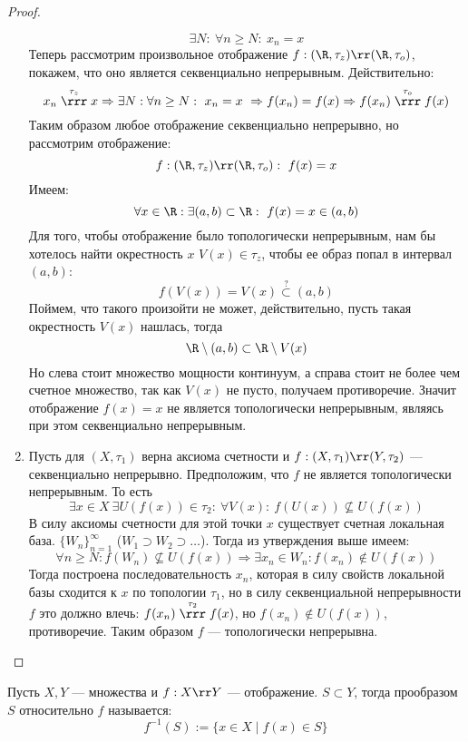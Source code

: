 \begin{proof}
\begin{enumerate}
$$	\exists N : \ \forall n \geq N :\ x_n = x
	$$
	Теперь рассмотрим произвольное отображение $f: (\R, \tau_z) \rr (\R, \tau_o)$, покажем, что оно является секвенциально непрерывным. Действительно:
	$$
	x_n \stackrel{\tau_z}{\rrr} x \Rightarrow \exists N: \forall n \geq N: \ x_n = x \ \Rightarrow f(x_n) = f(x) \Rightarrow f(x_n) \stackrel{\tau_o}{\rrr} f(x)
	$$
	Таким образом любое отображение секвенциально непрерывно, но рассмотрим отображение:
	$$
	f: (\R, \tau_z) \rr (\R, \tau_o) :\ f(x) = x
	$$
	Имеем:
	$$
	\forall x \in \R: \exists (a,b) \subset \R :\ f(x) = x \in (a,b)
	$$
	Для того, чтобы отображение было топологически непрерывным, нам бы хотелось найти окрестность $x$ $V(x) \in \tau_z$, чтобы ее образ  попал в интервал $(a,b)$: 
	$$
	f(V(x)) = V(x) \stackrel{?}{\subset} (a,b)
	$$ 
	Поймем, что такого произойти не может, действительно, пусть такая окрестность $V(x)$ нашлась, тогда
	$$
	\R \setminus (a,b) \subset \R \setminus V(x) 
	$$
	Но слева стоит множество мощности континуум, а справа стоит не более чем счетное множество, так как $V(x)$ не пусто, получаем противоречие. Значит отображение $f(x) = x$ не является топологически непрерывным, являясь при этом секвенциально непрерывным. 
	\item Пусть для $(X, \tau_1)$ верна аксиома счетности и $f : (X, \tau_1) \rr (Y, \tau_2)$ --- секвенциально непрерывно. Предположим, что $f$ не является топологически непрерывным. То есть 
	$$
	\exists x \in X \ \exists U(f(x)) \in \tau_2: \ \forall V(x): \ f(U(x)) \nsubseteq U(f(x))	$$
	В силу аксиомы счетности для этой точки $x$ существует счетная локальная база. $\{W_n\}_{n=1}^{\infty}$ ($W_1 \supset W_2 \supset \dots $). Тогда из утверждения выше имеем:
	$$
	\forall n \geq N : f(W_n) \nsubseteq U(f(x)) \Rightarrow \exists x_n \in W_n: f(x_n) \notin U(f(x))
	$$
	Тогда построена последовательность $x_n$, которая в силу свойств локальной базы сходится к $x$ по топологии $\tau_1$, но в силу секвенциальной непрерывности $f$ это должно влечь: $f(x_n) \stackrel{\tau_2}{\rrr} f(x)$, но $f(x_n) \notin U(f(x))$, противоречие. Таким образом $f$ --- топологически непрерывна.
\end{enumerate}
\end{proof}
\begin{definition}
	Пусть $X,Y$ --- множества и $f: X \rr Y$ --- отображение. $ S \subset Y$, тогда прообразом $S$ относительно $f$ называется:
	$$
	f^{-1}(S) := \{ x \in X \mid f(x) \in S\}
	$$
\end{definition}
